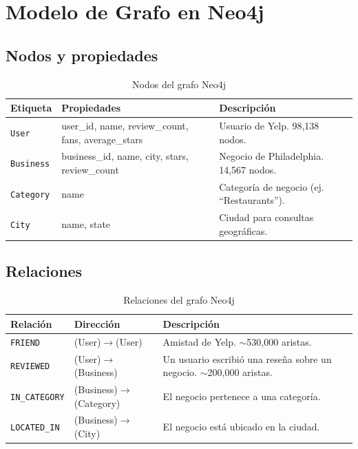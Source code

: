 \documentclass[12pt,a4paper]{article}
\begin{document}
\section{Modelo de Grafo en Neo4j}

\subsection{Nodos y propiedades}

\begin{table}[H]
\centering
\caption{Nodos del grafo Neo4j}
\begin{tabular}{>{\ttfamily}p{1.8cm} p{5.5cm} p{6.5cm}}
\toprule
\normalfont\textbf{Etiqueta} & \textbf{Propiedades} & \textbf{Descripción} \\
\midrule
\texttt{User}     & user\_id, name, review\_count, fans, average\_stars & Usuario de Yelp. 98,138 nodos. \\
\texttt{Business} & business\_id, name, city, stars, review\_count      & Negocio de Philadelphia. 14,567 nodos. \\
\texttt{Category} & name                                                 & Categoría de negocio (ej. ``Restaurants''). \\
\texttt{City}     & name, state                                         & Ciudad para consultas geográficas. \\
\bottomrule
\end{tabular}
\end{table}

\subsection{Relaciones}

\begin{table}[H]
\centering
\caption{Relaciones del grafo Neo4j}
\begin{tabular}{llp{7cm}}
\toprule
\textbf{Relación} & \textbf{Dirección} & \textbf{Descripción} \\
\midrule
\texttt{FRIEND}      & (User)$\to$(User)     & Amistad de Yelp. $\sim$530,000 aristas. \\
\texttt{REVIEWED}    & (User)$\to$(Business) & Un usuario escribió una reseña sobre un negocio. $\sim$200,000 aristas. \\
\texttt{IN\_CATEGORY}& (Business)$\to$(Category) & El negocio pertenece a una categoría. \\
\texttt{LOCATED\_IN} & (Business)$\to$(City)  & El negocio está ubicado en la ciudad. \\
\bottomrule
\end{tabular}
\end{table}
\end{document}
